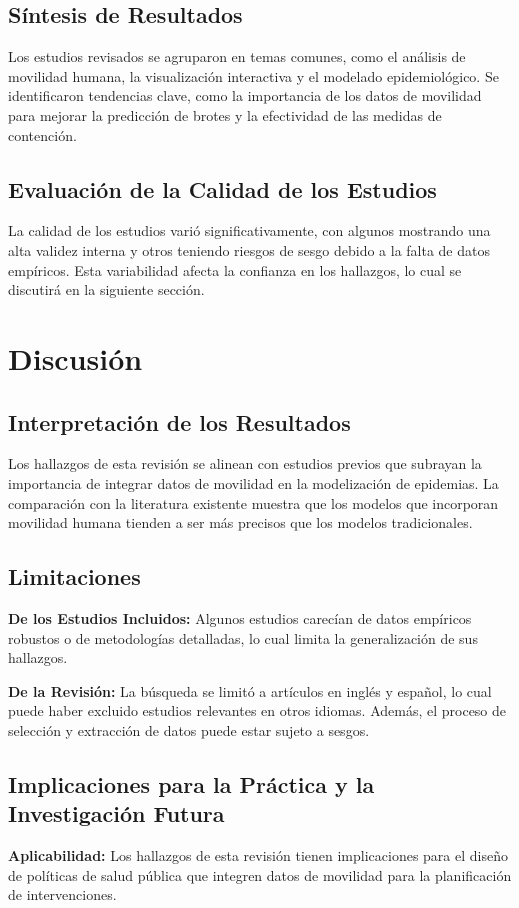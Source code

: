 \documentclass[sigconf]{acmart}
\begin{document}
\subsection{Síntesis de Resultados}
Los estudios revisados se agruparon en temas comunes, como el análisis de movilidad humana, la visualización interactiva y el modelado epidemiológico. Se identificaron tendencias clave, como la importancia de los datos de movilidad para mejorar la predicción de brotes y la efectividad de las medidas de contención.

\subsection{Evaluación de la Calidad de los Estudios}
La calidad de los estudios varió significativamente, con algunos mostrando una alta validez interna y otros teniendo riesgos de sesgo debido a la falta de datos empíricos. Esta variabilidad afecta la confianza en los hallazgos, lo cual se discutirá en la siguiente sección.

\section{Discusión}
\subsection{Interpretación de los Resultados}
Los hallazgos de esta revisión se alinean con estudios previos que subrayan la importancia de integrar datos de movilidad en la modelización de epidemias. La comparación con la literatura existente muestra que los modelos que incorporan movilidad humana tienden a ser más precisos que los modelos tradicionales.

\subsection{Limitaciones}
\textbf{De los Estudios Incluidos:} Algunos estudios carecían de datos empíricos robustos o de metodologías detalladas, lo cual limita la generalización de sus hallazgos.

\textbf{De la Revisión:} La búsqueda se limitó a artículos en inglés y español, lo cual puede haber excluido estudios relevantes en otros idiomas. Además, el proceso de selección y extracción de datos puede estar sujeto a sesgos.

\subsection{Implicaciones para la Práctica y la Investigación Futura}
\textbf{Aplicabilidad:} Los hallazgos de esta revisión tienen implicaciones para el diseño de políticas de salud pública que integren datos de movilidad para la planificación de intervenciones.
\end{document}
